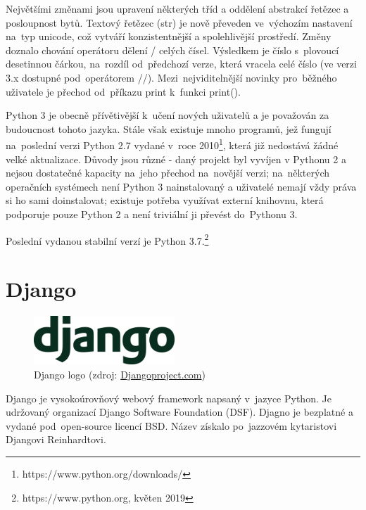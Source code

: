 Největšími změnami jsou upravení některých tříd a oddělení abstrakcí
\textsf{řetězec} a \textsf{posloupnost bytů}. Textový řetězec
(\textsf{str}) je nově převeden ve~výchozím nastavení na~typ unicode,
což vytváří konzistentnější a spolehlivější prostředí. Změny doznalo
chování operátoru dělení \textsf{/} celých čísel. Výsledkem je číslo s~plovoucí 
desetinnou čárkou, na~rozdíl od~předchozí verze, která
vracela celé číslo (ve verzi 3.x dostupné pod~operátorem
\textsf{//}). Mezi~nejviditelnější novinky pro~běžného uživatele je
přechod od~příkazu \textsf{print} k~funkci \textsf{print()}. \cite{python-notes}

Python 3 je obecně přívětivější k~učení nových uživatelů a je
považován za budoucnost tohoto jazyka. Stále však existuje mnoho
programů, jež fungují na~poslední verzi Python 2.7 vydané v~roce
2010\footnote{https://www.python.org/downloads/}, která již nedostává
žádné velké aktualizace. Důvody jsou různé - daný projekt byl vyvíjen
v Pythonu 2 a nejsou dostatečné kapacity na~jeho přechod na~novější
verzi; na~některých operačních systémech není Python 3 nainstalovaný a
uživatelé nemají vždy práva si ho sami doinstalovat; \linebreak existuje potřeba
využívat externí knihovnu, která podporuje pouze Python 2 a není
triviální ji převést do~Pythonu 3.

Poslední vydanou stabilní verzí je Python
3.7.\footnote{https://www.python.org, květen 2019}

\section{Django}

\begin{figure}[H] \centering
      \includegraphics[width=150pt]{./pictures/django-logo-positive.png}
      \caption[Django logo]{Django logo (zdroj:
\href{https://static.djangoproject.com/img/logos/django-logo-positive.png}{Djangoproject.com})}
      \label{fig:django}
  \end{figure}

Django je vysokoúrovňový webový framework napsaný v~jazyce Python. Je
udržovaný organizací Django Software Foundation (DSF). Djagno je bezplatné a
vydané pod~open-source licencí BSD. Název získalo po~jazzovém
kytaristovi Djangovi Reinhardtovi. \cite{definitiveguide}

